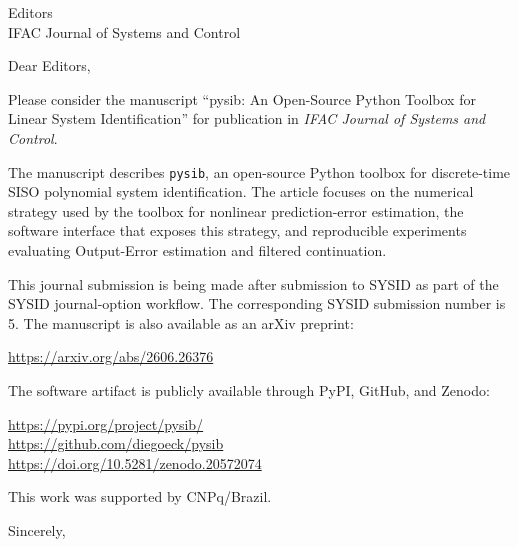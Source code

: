 \documentclass[11pt]{letter}
\begin{document}
\begin{letter}{Editors\\
IFAC Journal of Systems and Control}

\opening{Dear Editors,}

Please consider the manuscript ``pysib: An Open-Source Python Toolbox for
Linear System Identification'' for publication in \emph{IFAC Journal of
Systems and Control}.

The manuscript describes \texttt{pysib}, an open-source Python toolbox for
discrete-time SISO polynomial system identification.  The article focuses on
the numerical strategy used by the toolbox for nonlinear prediction-error
estimation, the software interface that exposes this strategy, and reproducible
experiments evaluating Output-Error estimation and filtered continuation.

This journal submission is being made after submission to SYSID as part of the
SYSID journal-option workflow.  The corresponding SYSID submission number is
5.  The manuscript is also available as an arXiv preprint:

\url{https://arxiv.org/abs/2606.26376}

The software artifact is publicly available through PyPI, GitHub, and Zenodo:

\url{https://pypi.org/project/pysib/}\\
\url{https://github.com/diegoeck/pysib}\\
\url{https://doi.org/10.5281/zenodo.20572074}

This work was supported by CNPq/Brazil.

\closing{Sincerely,}

\end{letter}
\end{document}
